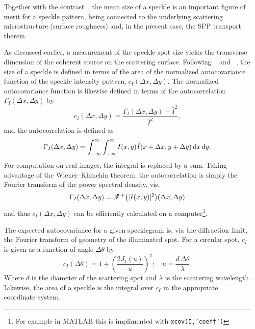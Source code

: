 Together with the contrast~\cite{goodman1975dependence}, the mean size of a
speckle is an important figure of merit for a speckle pattern, being connected
to the underlying scattering microstructure (surface roughness) and, in the
present case, the SPP transport therein.

As discussed earlier, a measurement of the speckle spot
size yields the transverse dimension of the coherent source
on the scattering surface.
Following ~\cite{goodman1975statistical} and
~\cite{dainty1975laser}, the size of a speckle is defined in
terms of the area of the normalized autocovariance function of the speckle
intensity pattern, $c_I(\Delta x, \Delta y)$.  The normalized autocovariance
function is likewise defined in terms of the autocorrelation $\Gamma_I(\Delta
x, \Delta y)$ by 
\begin{equation}
c_I(\Delta x, \Delta y) = \frac{\Gamma_I(\Delta x, \Delta y) - \bar{I}^2}{\bar{I}^2},
\label{eqn:normxcov}
\end{equation}
and the autocorrelation is defined as
\begin{equation}
\Gamma_I(\Delta x, \Delta y) = \int_{-\infty}^{\infty}\int_{-\infty}^{\infty} I(x,y) \tilde{I}(x+\Delta x,y+\Delta y) \,\mathrm{d} x \,\mathrm{d} y.
\end{equation}
For computation on real images, the integral is replaced by a sum.  Taking
advantage of the Wiener–Khinchin theorem, the autocorrelation is simply the
Fourier transform of the power spectral density, vis.
\begin{equation}
\Gamma_I(\Delta x, \Delta y) = {\mathscr{F}^{+}\bigl(|I(x,y)|^2\bigr)}(\Delta x, \Delta y)
\end{equation}
and thus  $c_I(\Delta x, \Delta y)$ can be efficiently calculated on a
computer\footnote{For example in MATLAB this is implimented with
\texttt{xcov(I,'coeff')}}.

The expected autocovariance for a given specklegram is, via the diffraction
limit, the Fourier transform of geometry of the illuminated spot.  For a
circular spot, $c_I$ is given as a function of angle $\Delta \theta$ by
\begin{equation}
c_I\left(\Delta \theta\right) = 1 + \left(\frac{2 J_1(u)}{u}\right)^2;\quad
u=\frac{d\, \Delta\theta}{\lambda}.
\label{eqn:angularsize}
\end{equation}
Where $d$ is the diameter of the scattering spot and $\lambda$ is the
scattering wavelength.  Likewise, the area of a speckle is the integral over
$c_I$ in the appropriate coordinate system.

